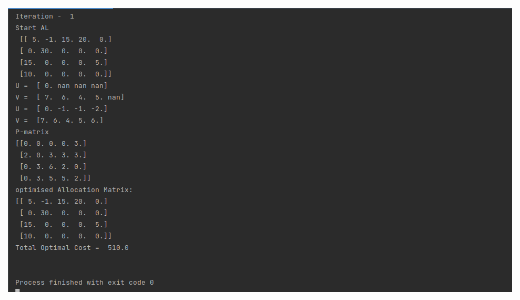 \documentclass[12pt, letterpaper, twoside]{book}
\begin{document}
\includegraphics[width=550pt]{Output10}

\pagebreak
\end{document}
